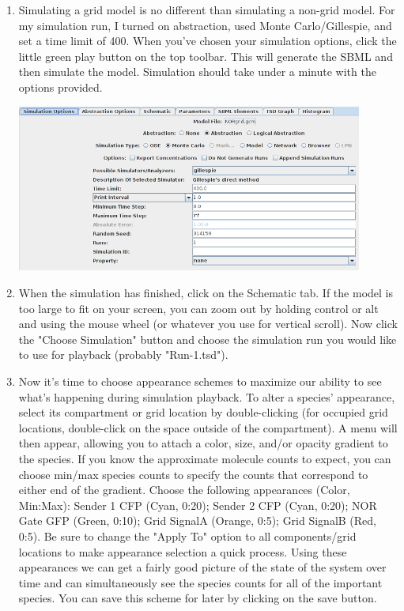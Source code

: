 \documentclass[titlepage,11pt]{article}
\begin{document}
\begin{enumerate}

\item Simulating a grid model is no different than simulating a non-grid model.  For my simulation run, I turned on abstraction, used Monte Carlo/Gillespie, and set a time limit of 400.  When you've chosen your simulation options, click the little green play button on the top toolbar.  This will generate the SBML and then simulate the model.  Simulation should take under a minute with the options provided.

\includegraphics[height=55mm]{screenshots/grid_sim_options}

\item When the simulation has finished, click on the Schematic tab.  If the model is too large to fit on your screen, you can zoom out by holding control or alt and using the mouse wheel (or whatever you use for vertical scroll).  Now click the "Choose Simulation" button and choose the simulation run you would like to use for playback (probably "Run-1.tsd").

\item Now it's time to choose appearance schemes to maximize our ability to see what's happening during simulation playback.  To alter a species' appearance, select its compartment or grid location by double-clicking (for occupied grid locations, double-click on the space outside of the compartment).  A menu will then appear, allowing you to attach a color, size, and/or opacity gradient to the species.  If you know the approximate molecule counts to expect, you can choose min/max species counts to specify the counts that correspond to either end of the gradient.  Choose the following appearances (Color, Min:Max): Sender 1 CFP (Cyan, 0:20); Sender 2 CFP (Cyan, 0:20); NOR Gate GFP (Green, 0:10); Grid SignalA (Orange, 0:5); Grid SignalB (Red, 0:5).  Be sure to change the "Apply To" option to all components/grid locations to make appearance selection a quick process.  Using these appearances we can get a fairly good picture of the state of the system over time and can simultaneously see the species counts for all of the important species.  You can save this scheme for later by clicking on the save button.


\end{enumerate}
\end{document}
